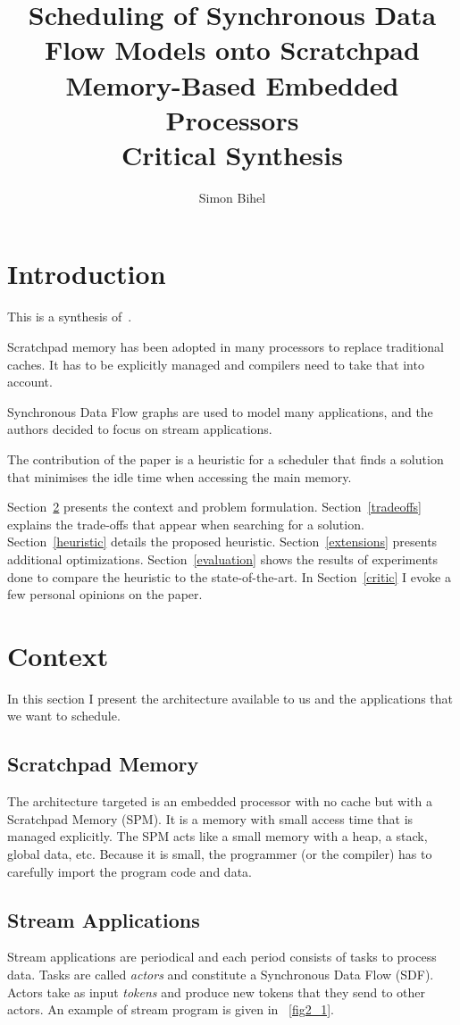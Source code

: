 \documentclass{article}
\title{Scheduling of Synchronous Data Flow Models onto Scratchpad Memory-Based Embedded Processors \\
        \large Critical Synthesis}
\author{Simon Bihel}
\begin{document}
\maketitle

\section{Introduction}
This is a synthesis of~\cite{che2013scheduling}.

Scratchpad memory has been adopted in many processors to replace traditional caches.
It has to be explicitly managed and compilers need to take that into account.

Synchronous Data Flow graphs are used to model many applications, and the authors decided to focus on stream applications.

The contribution of the paper is a heuristic for a scheduler that finds a solution that minimises the idle time when accessing the main memory.

Section~\ref{context} presents the context and problem formulation.
Section~\ref{tradeoffs} explains the trade-offs that appear when searching for a solution.
Section~\ref{heuristic} details the proposed heuristic.
Section~\ref{extensions} presents additional optimizations. %
Section~\ref{evaluation} shows the results of experiments done to compare the heuristic to the state-of-the-art.
In Section~\ref{critic} I evoke a few personal opinions on the paper.

\section{Context}
\label{context}
In this section I present the architecture available to us and the applications that we want to schedule.

\subsection{Scratchpad Memory}
The architecture targeted is an embedded processor with no cache but with a Scratchpad Memory (SPM).
It is a memory with small access time that is managed explicitly.
The SPM acts like a small memory with a heap, a stack, global data, etc.
Because it is small, the programmer (or the compiler) has to carefully import the program code and data.

\subsection{Stream Applications}
Stream applications are periodical and each period consists of tasks to process data.
Tasks are called \textit{actors} and constitute a Synchronous Data Flow (SDF).
Actors take as input \textit{tokens} and produce new tokens that they send to other actors.
An example of stream program is given in \figurename~\ref{fig2_1}.
\end{document}
